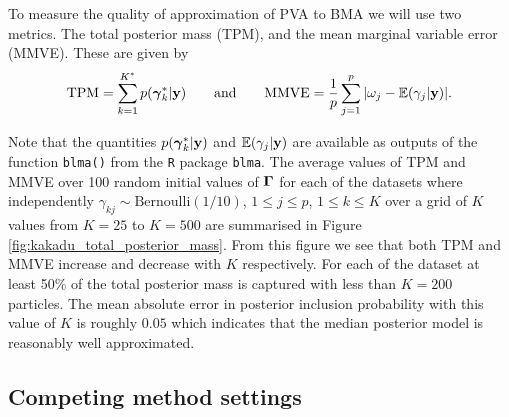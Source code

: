\noindent 
To measure the quality of approximation of PVA to BMA we will use two metrics. The total posterior mass (TPM), and the mean marginal variable error (MMVE). These are given by
$$
\displaystyle \mbox{TPM} = \sum_{k=1}^{K^*} p({\boldsymbol \gamma}_k^*|{\bf y}) 
\qquad \mbox{and}  \qquad 
\mbox{MMVE} = \frac{1}{p} \sum_{j=1}^p |\omega_j - {\mathbb E}(\gamma_j|{\bf y}) |.
$$

\noindent Note that the quantities $p({\boldsymbol \gamma}_k^*|{\bf y})$ and ${\mathbb E}(\gamma_j|{\bf y})$ are
available as outputs of the function {\tt blma()} from the {\tt R} package {\tt blma}.
The average values of TPM and MMVE over 100 random initial values of ${\boldsymbol \Gamma}$ for each
of the datasets where independently $\gamma_{kj} \sim \mbox{Bernoulli}(1/10)$, $1\le j\le p$,
$1\le k\le K$ over a grid of $K$ values from $K=25$ to $K=500$ are summarised in Figure 
\ref{fig:kakadu_total_posterior_mass}.
From this figure we see that both TPM and MMVE increase and
decrease with $K$ respectively. For each of the dataset at least 50\% of
the total posterior mass is captured with less than $K=200$ particles. 
The mean absolute error in posterior inclusion probability with this value of $K$ is roughly $0.05$ which indicates that the median posterior model is reasonably well approximated.



	
	
	
	

\subsection{Competing method settings}
\label{sec:settings} 


